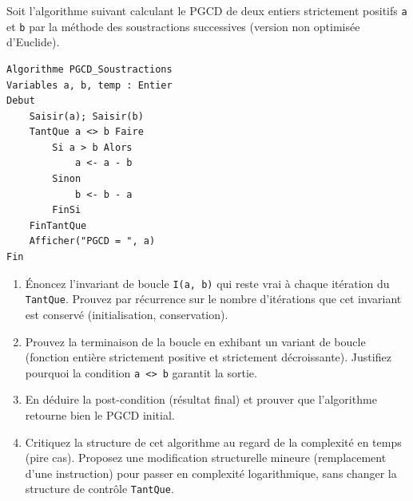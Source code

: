 \documentclass[11pt]{article}
\begin{document}
\begin{exercice}
Soit l'algorithme suivant calculant le PGCD de deux entiers strictement positifs \texttt{a} et \texttt{b} par la méthode des soustractions successives (version non optimisée d'Euclide).

\begin{verbatim}
Algorithme PGCD_Soustractions
Variables a, b, temp : Entier
Debut
    Saisir(a); Saisir(b)
    TantQue a <> b Faire
        Si a > b Alors
            a <- a - b
        Sinon
            b <- b - a
        FinSi
    FinTantQue
    Afficher("PGCD = ", a)
Fin
\end{verbatim}

\begin{enumerate}
    \item Énoncez l'invariant de boucle \texttt{I(a, b)} qui reste vrai à chaque itération du \texttt{TantQue}. Prouvez par récurrence sur le nombre d'itérations que cet invariant est conservé (initialisation, conservation).
    \item Prouvez la terminaison de la boucle en exhibant un variant de boucle (fonction entière strictement positive et strictement décroissante). Justifiez pourquoi la condition \texttt{a <> b} garantit la sortie.
    \item En déduire la post-condition (résultat final) et prouver que l'algorithme retourne bien le PGCD initial.
    \item Critiquez la structure de cet algorithme au regard de la complexité en temps (pire cas). Proposez une modification structurelle mineure (remplacement d'une instruction) pour passer en complexité logarithmique, sans changer la structure de contrôle \texttt{TantQue}.
\end{enumerate}
\end{exercice}
\end{document}
